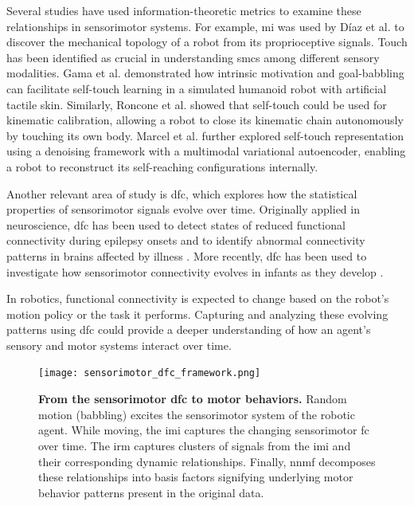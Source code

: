 Several studies have used information-theoretic metrics to examine these relationships in sensorimotor systems. 
For example, \ac{mi} was used by D\'iaz et al. \cite{DiazLedezma2023MachineLS} to discover the mechanical topology of a robot from its proprioceptive signals. Touch has been identified as crucial in understanding \acp{smc} among different sensory modalities. Gama et al. \cite{Gama2021Goaldirectedtactile} demonstrated how intrinsic motivation and goal-babbling can facilitate self-touch learning in a simulated humanoid robot with artificial tactile skin. Similarly, Roncone et al. \cite{Roncone2014Automatickinematicchain} showed that self-touch could be used for kinematic calibration, allowing a robot to close its kinematic chain autonomously by touching its own body. Marcel et al. \cite{Marcel2022Learningreachown} further explored self-touch representation using a denoising framework with a multimodal variational autoencoder, enabling a robot to reconstruct its self-reaching configurations internally.

Another relevant area of study is \ac{dfc}, which explores how the statistical properties of sensorimotor signals evolve over time. Originally applied in neuroscience, \ac{dfc} has been used to detect states of reduced functional connectivity during epilepsy onsets \cite{Christiaen2020Dynamicfunctionalconnectivity} and to identify abnormal connectivity patterns in brains affected by illness \cite{Zhou2020Earlychildhooddevelopmental}. More recently, \ac{dfc} has been used to investigate how sensorimotor connectivity evolves in infants as they develop \cite{Kanazawa2023Openendedmovements}.

In robotics, functional connectivity is expected to change based on the robot’s motion policy or the task it performs. Capturing and analyzing these evolving patterns using \ac{dfc} could provide a deeper understanding of how an agent’s sensory and motor systems interact over time.

\begin{figure}[h!]
	\centering
	\texttt{[image: sensorimotor\_dfc\_framework.png]}
	\caption{\textbf{From the sensorimotor \acl{dfc} to motor behaviors.} Random motion (babbling) excites the sensorimotor system of the robotic agent. While moving, the \ac{imi} captures the changing sensorimotor \ac{fc} over time. The \ac{irm} captures clusters of signals from the \ac{imi} and their corresponding dynamic relationships. Finally, \ac{nnmf} decomposes these relationships into basis factors signifying underlying motor behavior patterns present in the original data.}
	\label{fig:framework_overview}
\end{figure}

